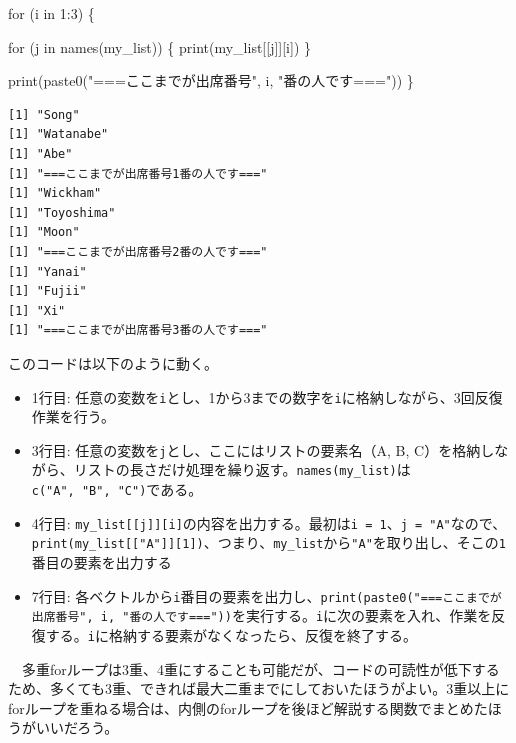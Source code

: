 \documentclass[
  a4paper,
  pandoc,
  ja=standard,
  jafont=haranoaji]{bxjsbook}
\newenvironment{Shaded}{\begin{snugshade}}{\end{snugshade}}
\newcommand{\ControlFlowTok}[1]{\textcolor[rgb]{0.00,0.48,0.65}{#1}}
\newcommand{\DecValTok}[1]{\textcolor[rgb]{0.68,0.00,0.00}{#1}}
\newcommand{\FunctionTok}[1]{\textcolor[rgb]{0.28,0.35,0.67}{#1}}
\newcommand{\NormalTok}[1]{\textcolor[rgb]{0.00,0.48,0.65}{#1}}
\newcommand{\SpecialCharTok}[1]{\textcolor[rgb]{0.37,0.37,0.37}{#1}}
\newcommand{\StringTok}[1]{\textcolor[rgb]{0.13,0.47,0.30}{#1}}
\providecommand{\tightlist}{%
  \setlength{\itemsep}{0pt}\setlength{\parskip}{0pt}}
\begin{document}
\begin{Shaded}
\begin{Highlighting}[numbers=left,,]
\ControlFlowTok{for}\NormalTok{ (i }\ControlFlowTok{in} \DecValTok{1}\SpecialCharTok{:}\DecValTok{3}\NormalTok{) \{}
  
  \ControlFlowTok{for}\NormalTok{ (j }\ControlFlowTok{in} \FunctionTok{names}\NormalTok{(my\_list)) \{}
    \FunctionTok{print}\NormalTok{(my\_list[[j]][i])}
\NormalTok{  \}}
  
  \FunctionTok{print}\NormalTok{(}\FunctionTok{paste0}\NormalTok{(}\StringTok{"===ここまでが出席番号"}\NormalTok{, i, }\StringTok{"番の人です==="}\NormalTok{))}
\NormalTok{\}}
\end{Highlighting}
\end{Shaded}

\begin{verbatim}
[1] "Song"
[1] "Watanabe"
[1] "Abe"
[1] "===ここまでが出席番号1番の人です==="
[1] "Wickham"
[1] "Toyoshima"
[1] "Moon"
[1] "===ここまでが出席番号2番の人です==="
[1] "Yanai"
[1] "Fujii"
[1] "Xi"
[1] "===ここまでが出席番号3番の人です==="
\end{verbatim}

このコードは以下のように動く。

\begin{itemize}
\tightlist
\item
  1行目:
  任意の変数を\texttt{i}とし、1から3までの数字を\texttt{i}に格納しながら、3回反復作業を行う。
\item
  3行目: 任意の変数を\texttt{j}とし、ここにはリストの要素名（A, B,
  C）を格納しながら、リストの長さだけ処理を繰り返す。\texttt{names(my\_list)}は\texttt{c("A",\ "B",\ "C")}である。
\item
  4行目:
  \texttt{my\_list{[}{[}j{]}{]}{[}i{]}}の内容を出力する。最初は\texttt{i\ =\ 1}、\texttt{j\ =\ "A"}なので、\texttt{print(my\_list{[}{[}"A"{]}{]}{[}1{]})}、つまり、\texttt{my\_list}から\texttt{"A"}を取り出し、そこの\texttt{1}番目の要素を出力する
\item
  7行目:
  各ベクトルから\texttt{i}番目の要素を出力し、\texttt{print(paste0("===ここまでが出席番号",\ i,\ "番の人です==="))}を実行する。\texttt{i}に次の要素を入れ、作業を反復する。\texttt{i}に格納する要素がなくなったら、反復を終了する。
\end{itemize}

　多重forループは3重、4重にすることも可能だが、コードの可読性が低下するため、多くても3重、できれば最大二重までにしておいたほうがよい。3重以上にforループを重ねる場合は、内側のforループを後ほど解説する関数でまとめたほうがいいだろう。
\end{document}
